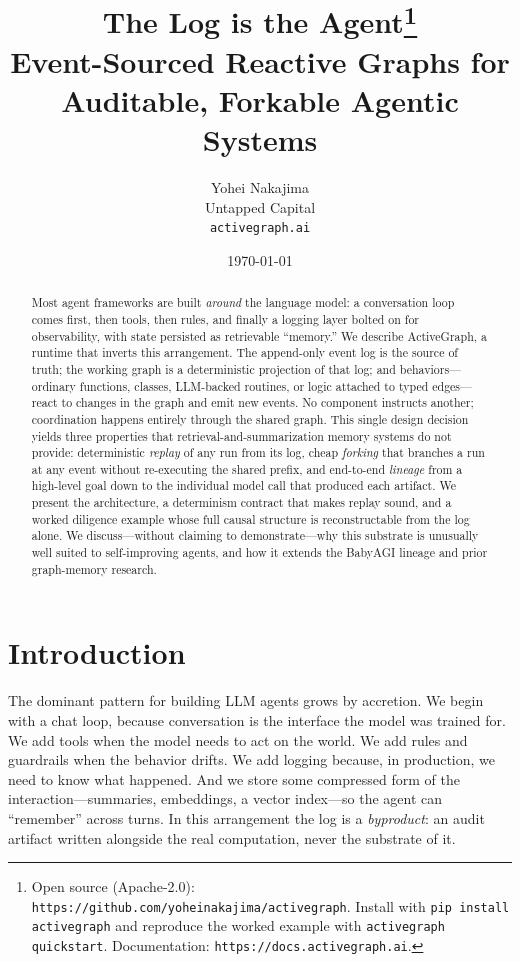 \documentclass[11pt]{article}
\title{\textbf{The Log is the Agent}\thanks{Open source (Apache-2.0): \texttt{https://github.com/yoheinakajima/activegraph}. Install with \texttt{pip install activegraph} and reproduce the worked example with \texttt{activegraph quickstart}. Documentation: \texttt{https://docs.activegraph.ai}.}\\[0.3em]
\large Event-Sourced Reactive Graphs for Auditable, Forkable Agentic Systems}
\author{Yohei Nakajima\\
\small Untapped Capital \\
\small \texttt{activegraph.ai}}
\date{\today}
\begin{document}
\maketitle

\begin{abstract}
\noindent
Most agent frameworks are built \emph{around} the language model: a conversation
loop comes first, then tools, then rules, and finally a logging layer bolted on
for observability, with state persisted as retrievable ``memory.'' We describe
ActiveGraph, a runtime that inverts this arrangement. The append-only event log
is the source of truth; the working graph is a deterministic projection of that
log; and behaviors---ordinary functions, classes, LLM-backed routines, or logic
attached to typed edges---react to changes in the graph and emit new events. No
component instructs another; coordination happens entirely through the shared
graph. This single design decision yields three properties that
retrieval-and-summarization memory systems do not provide: deterministic
\emph{replay} of any run from its log, cheap \emph{forking} that branches a run
at any event without re-executing the shared prefix, and end-to-end
\emph{lineage} from a high-level goal down to the individual model call that
produced each artifact. We present the architecture, a determinism contract that
makes replay sound, and a worked diligence example whose full causal structure
is reconstructable from the log alone. We discuss---without claiming to
demonstrate---why this substrate is unusually well suited to self-improving
agents, and how it extends the BabyAGI lineage and prior graph-memory research.
\end{abstract}

\section{Introduction}

The dominant pattern for building LLM agents grows by accretion. We begin with a
chat loop, because conversation is the interface the model was trained for. We
add tools when the model needs to act on the world. We add rules and guardrails
when the behavior drifts. We add logging because, in production, we need to know
what happened. And we store some compressed form of the interaction---summaries,
embeddings, a vector index---so the agent can ``remember'' across turns. In this
arrangement the log is a \emph{byproduct}: an audit artifact written alongside
the real computation, never the substrate of it.
\end{document}
